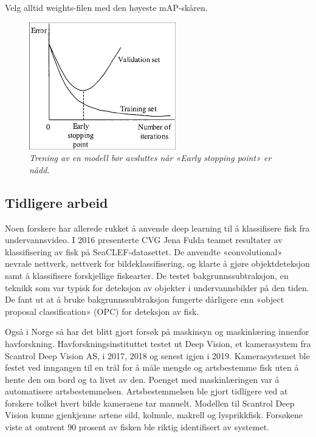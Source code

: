 Velg alltid weights-filen med den høyeste mAP-skåren.

\begin{figure}[h]
\begin{center} 
\includegraphics[scale=1.0]{figures/early_stopping_point}
\caption{\small \sl Trening av en modell bør avsluttes når «Early stopping point» er nådd. \cite{Bochkovskiy 2020} \label{fig:early_stopping_point}}
\end{center}
\end{figure}

\subsection{Tidligere arbeid}

\label{part:prev_work}
Noen forskere har allerede rukket å anvende deep learning til å klassifisere fisk fra undervannsvideo. I 2016 presenterte CVG Jena Fulda teamet resultater av klassifisering av fisk på SeaCLEF-datasettet. De anvendte «convolutional» nevrale nettverk, nettverk for bildeklassifisering, og klarte å gjøre objektdeteksjon samt å klassifisere forskjellige fiskearter. De testet bakgrunnssubtraksjon, en teknikk som var typisk for deteksjon av objekter i undervannsbilder på den tiden. De fant ut at å bruke bakgrunnssubtraksjon fungerte dårligere enn «object proposal classification» (OPC) for deteksjon av fisk. \cite{Rodner m.fl. 2016}


Også i Norge så har det blitt gjort forsøk på maskinsyn og maskinlæring innenfor havforskning. Havforskningsinstituttet testet ut Deep Vision, et kamerasystem fra Scantrol Deep Vision AS, i 2017, 2018 og senest igjen i 2019. Kamerasystemet ble festet ved inngangen til en trål for å måle mengde og artsbestemme fisk uten å hente den om bord og ta livet av den. Poenget med maskinlæringen var å automatisere artsbestemmelsen. Artsbestemmelsen ble gjort tidligere ved at forskere tolket hvert bilde kameraene tar manuelt. Modellen til Scantrol Deep Vision kunne gjenkjenne artene sild, kolmule, makrell og lysprikkfisk. Forsøkene viste at omtrent 90 prosent av fisken ble riktig identifisert av systemet. \cite{Fenstad 2019}

